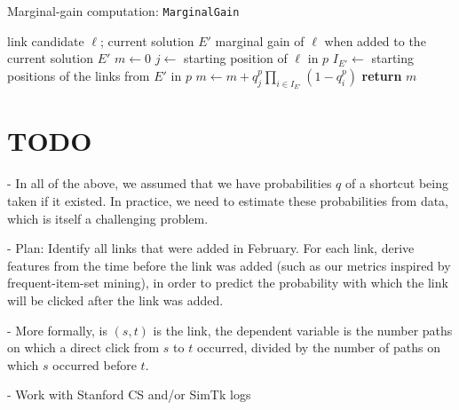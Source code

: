 \documentclass[11pt,letterpaper]{article}
\begin{document}
\begin{algorithm}[t]
\caption{Marginal-gain computation: \texttt{MarginalGain}}
\begin{algorithmic}[1]
\label{alg:marginal_gain}
\INPUT link candidate $\ell$; current solution $E'$
\OUTPUT marginal gain of $\ell$ when added to the current solution $E'$
\STATE $m \leftarrow 0$
  \STATE $j \leftarrow$ starting position of $\ell$ in $p$
  \STATE $I_{E'} \leftarrow$ starting positions of the links from $E'$ in $p$
  \STATE $m \leftarrow m + q^p_j \prod_{i \in I_{E'}} (1 - q^p_i)$
\ENDFOR
\STATE \textbf{return} $m$
\end{algorithmic}
\end{algorithm}



\section{TODO}

- In all of the above, we assumed that we have probabilities $q$ of a shortcut being taken if it existed.
In practice, we need to estimate these probabilities from data, which is itself a challenging problem.

- Plan: Identify all links that were added in February. For each link, derive features from the time before the link was added (such as our metrics inspired by frequent-item-set mining), in order to predict the probability with which the link will be clicked after the link was added.

- More formally, is $(s,t)$ is the link, the dependent variable is the number paths on which a direct click from $s$ to $t$ occurred, divided by the number of paths on which $s$ occurred before $t$.

- Work with Stanford CS and/or SimTk logs
\end{document}
